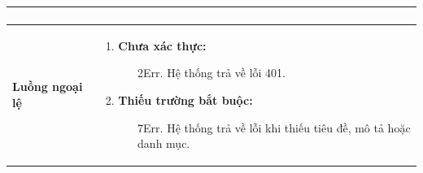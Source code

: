 {\begin{tabularx}{\textwidth}{|>{\raggedright\arraybackslash}X|>{\raggedright\arraybackslash}X|}
\begin{enumerate}
\end{enumerate} \\
\hline
\textbf{Luồng ngoại lệ} &
\begin{enumerate}
    \item \textbf{Chưa xác thực:}
    \begin{enumerate}
        \item[2Err.] Hệ thống trả về lỗi 401.
    \end{enumerate}
    \item \textbf{Thiếu trường bắt buộc:}
    \begin{enumerate}
        \item[7Err.] Hệ thống trả về lỗi khi thiếu tiêu đề, mô tả hoặc danh mục.
    \end{enumerate}
\end{enumerate} \\
\hline
\end{tabularx}
}
